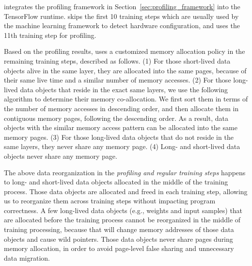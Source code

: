 \name integrates the profiling framework in Section~\ref{sec:profiling_framework} into the TensorFlow runtime. \textcolor{check}{\name skips the first 10 training steps which are usually used by the machine learning framework to detect hardware configuration, and uses the 11th training step for profiling.}


\textcolor{check}{Based on the profiling results, \name uses a customized memory allocation policy in the remaining training steps, described as follows. (1) For those short-lived data objects alive in the same layer, they are allocated into the same pages, because of their same live time and a similar number of memory accesses. (2) For those long-lived data objects that reside in the exact same layers, we use the following algorithm to determine their memory co-allocation. We first sort them in terms of the number of memory accesses in descending order, and then allocate them in contiguous memory pages, following the descending order. As a result, data objects with %
\textcolor{check}{the similar memory access pattern} %
can be allocated into the same memory pages. (3) For those long-lived data objects that do not reside in the same layers, they never share any memory page. (4) Long- and short-lived data objects never share any memory page. 
}


\textcolor{check}{
The above data reorganization in the \textit{profiling and regular training steps} happens to long- and short-lived data objects allocated in the middle of the training process.  Those data objects are allocated and freed in each training step, allowing us to reorganize them across training steps without impacting program correctness. A few long-lived data objects (e.g., weights and input samples) that are allocated before the training process cannot be reorganized in the middle of training processing, because that will change memory addresses of those data objects and cause wild pointers. Those data objects never share pages during memory allocation, in order to avoid page-level false sharing and unnecessary data migration. 
}


